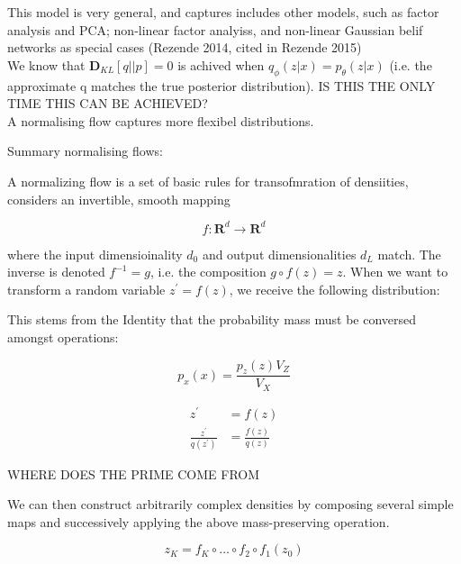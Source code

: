 \documentclass[a4paper,12pt,twoside,openright]{report}
\begin{document}
This model is very general, and captures includes other models, such as factor analysis and PCA; non-linear factor analyiss, and non-linear Gaussian belif networks as special cases (Rezende 2014, cited in Rezende 2015) \\

We know that $\mathbf{D}_{KL}\left[ q || p\right] = 0$ is achived when $q_\phi(z|x) = p_\theta(z|x)$ (i.e. the approximate q matches the true posterior distribution). IS THIS THE ONLY TIME THIS CAN BE ACHIEVED? \\

A normalising flow captures more flexibel distributions.

Summary normalising flows:

A normalizing flow is a set of basic rules for transofmration of densiities, considers an invertible, smooth mapping

$$
f : \mathbf{R}^d \rightarrow \mathbf{R}^d
$$

where the input dimensioinality $d_0$ and output dimensionalities  $d_L$ match.
The inverse is denoted $f^{-1} = g$, i.e. the composition $g \circ f(z) = z$.
When we want to transform a random variable $z^\prime = f(z)$, we receive the following distribution:



This stems from the Identity that the probability mass must be conversed amongst operations:

\begin{equation}
p_x(x) = \frac{p_z(z) V_Z}{V_X}
\end{equation}

\begin{align}
	z^\prime &= f(z) \\
	\frac{z^\prime}{ q(z^\prime) } &= \frac{f(z)}{ q(z) }
\end{align}

WHERE DOES THE PRIME COME FROM

We can then construct arbitrarily complex densities by composing several simple maps and successively applying the above mass-preserving operation.

\begin{equation}
z_K = f_K \circ \ldots \circ f_2 \circ f_1 (z_0)
\end{equation}
\end{document}
